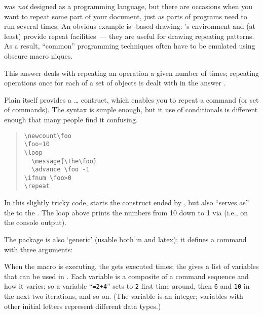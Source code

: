 
\tex{} was \emph{not} designed as a programming language, but there
are occasions when you want to repeat some part of your document, just
as parts of programs need to run several times.  An obvious
example is \tex{}-based drawing: \latex{}'s 
environment and  (at least) provide repeat facilities~---
they are useful for drawing repeating patterns.  As a result,
``common'' programming techniques often have to be emulated using
obscure macro \tex{}niques.

This answer deals with repeating an operation a given number of times;
repeating operations once for each of a set of objects is dealt with
in the answer .

Plain \tex{} itself provides a  \dots{} 
contruct, which enables you to repeat a command (or set of commands).
The syntax is simple enough, but it use of \tex{} conditionals is
different enough that many people find it confusing.
\begin{quote}
\begin{verbatim}
\newcount\foo
\foo=10
\loop
  \message{\the\foo}
  \advance \foo -1
\ifnum \foo>0
\repeat
\end{verbatim}
\end{quote}
In this slightly tricky code,  starts the construct ended by
, but  also ``serves as'' the  to the
.  The loop above prints the numbers from 10 down to 1 via
\tex{}  (i.e., on the console output).

The  package is also `generic' (usable both in
\plaintex{} and latex{}); it defines a command  with
three arguments:
\begin{quote}
\end{quote}
When the macro is executing, the  gets executed
 times; the  gives a list of
variables that can be used in .  Each variable is a
composite of a command sequence and how it varies; so a variable
``\texttt{=2+4}'' sets  to \texttt{2} first time
around, then \texttt{6} and \texttt{10} in the next two iterations,
and so on.  (The variable  is an integer; variables with other
initial letters represent different data types.)

